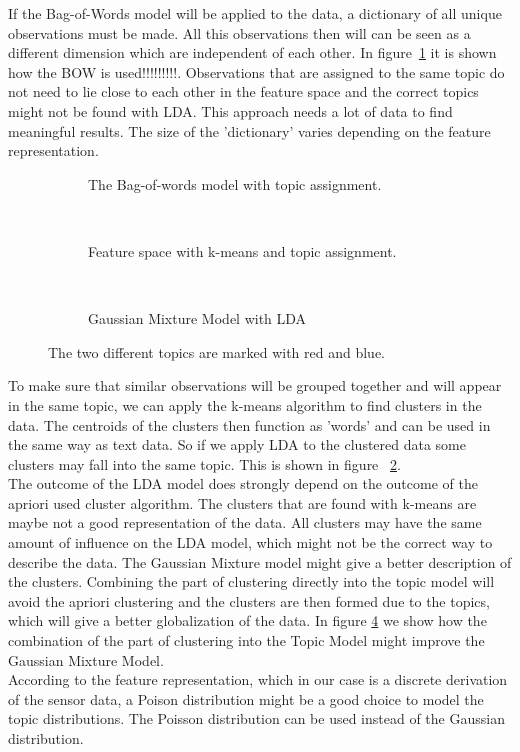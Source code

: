 \documentclass[a4paper,fleqn]{article}
\begin{document}
If the Bag-of-Words model will be applied to the data, a dictionary of all unique observations must be made. All this observations then will can be seen as a different dimension which are independent of each other. In figure~\ref{fig:FSBOW} it is shown how the BOW is used!!!!!!!!!. Observations that are assigned to the same topic do not need to lie close to each other in the feature space and the correct topics might not be found with LDA. This approach needs a lot of data to find meaningful results. The size of the 'dictionary' varies depending on the feature representation. 

\begin{figure}[h!]
\centering
\begin{subfigure}[b]{0.3\linewidth}
\centering
\def\svgwidth{140pt}

\caption{The Bag-of-words model with topic assignment.}
\label{fig:FSBOW}
\end{subfigure}
~
\begin{subfigure}[b]{0.3\linewidth}
\centering
\def\svgwidth{140pt}

\caption{Feature space with k-means and topic assignment.}
\label{fig:FSk-means}
\end{subfigure}
~
\begin{subfigure}[b]{0.3\textwidth}
\centering
\def\svgwidth{140pt}

\caption{Gaussian Mixture Model with LDA}
\label{fig:GMM+LDA}
\end{subfigure}
\caption{The two different topics are marked with red and blue.}
\end{figure}

To make sure that similar observations will be grouped together and will appear in the same topic, we can apply the k-means algorithm to find clusters in the data. The centroids of the clusters then function as 'words' and can be used in the same way as text data. So if we apply LDA to the clustered data some clusters may fall into the same topic. This is shown in figure ~\ref{fig:FSk-means}.\\
The outcome of the LDA model does strongly depend on the outcome of the apriori used cluster algorithm. The clusters that are found with k-means are maybe not a good representation of the data. All clusters may have the same amount of influence on the LDA model, which might not be the correct way to describe the data. The Gaussian Mixture model might give a better description of the clusters. Combining the part of clustering directly into the topic model will avoid the apriori clustering and the clusters are then formed due to the topics, which will give a better globalization of the data. In figure \ref{fig:GMM+LDA} we show how the combination of the part of clustering into the Topic Model might improve the Gaussian Mixture Model.\\
According to the feature representation, which in our case is a discrete derivation of the sensor data, a Poison distribution might be a good choice to model the topic distributions. The Poisson distribution can be used instead of the Gaussian distribution.
\end{document}
